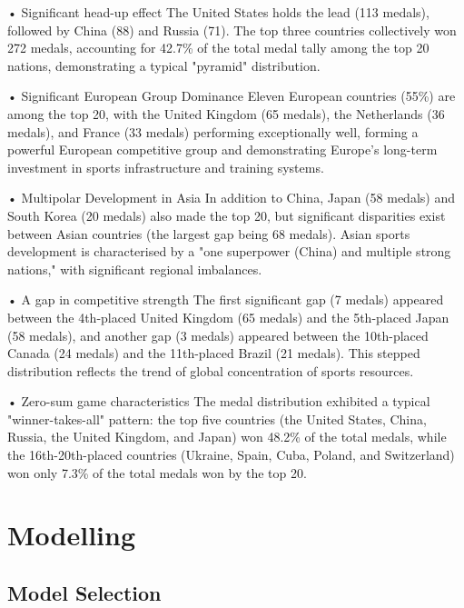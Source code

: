 \documentclass[11pt,twoside]{article}
\numberwithin{Theorem}{section}
\numberwithin{Definition}{section}
\numberwithin{Lemma}{section}
\numberwithin{Algorithm}{section}
\numberwithin{equation}{section}
\begin{document}
• Significant head-up effect
The United States holds the lead (113 medals), followed by China (88) and Russia (71). The top three countries collectively won 272 medals, accounting for 42.7\% of the total medal tally among the top 20 nations, demonstrating a typical "pyramid" distribution.

• Significant European Group Dominance
Eleven European countries (55\%) are among the top 20, with the United Kingdom (65 medals), the Netherlands (36 medals), and France (33 medals) performing exceptionally well, forming a powerful European competitive group and demonstrating Europe's long-term investment in sports infrastructure and training systems.

• Multipolar Development in Asia
In addition to China, Japan (58 medals) and South Korea (20 medals) also made the top 20, but significant disparities exist between Asian countries (the largest gap being 68 medals). Asian sports development is characterised by a "one superpower (China) and multiple strong nations," with significant regional imbalances. 

• A gap in competitive strength
The first significant gap (7 medals) appeared between the 4th-placed United Kingdom (65 medals) and the 5th-placed Japan (58 medals), and another gap (3 medals) appeared between the 10th-placed Canada (24 medals) and the 11th-placed Brazil (21 medals). This stepped distribution reflects the trend of global concentration of sports resources.

• Zero-sum game characteristics
The medal distribution exhibited a typical "winner-takes-all" pattern: the top five countries (the United States, China, Russia, the United Kingdom, and Japan) won 48.2\% of the total medals, while the 16th-20th-placed countries (Ukraine, Spain, Cuba, Poland, and Switzerland) won only 7.3\% of the total medals won by the top 20.


\clearpage

\section{Modelling}
\label{sec:modelling}

\subsection{Model Selection}
\label{subsec:model_selection}
\end{document}
